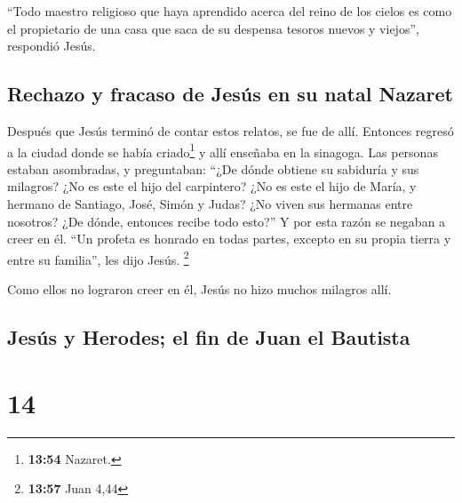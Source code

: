  ``Todo maestro religioso que haya aprendido acerca del
reino de los cielos es como el propietario de una casa que saca de su
despensa tesoros nuevos y viejos'', respondió Jesús.

\hypertarget{rechazo-y-fracaso-de-jesuxfas-en-su-natal-nazaret}{%
\subsection{Rechazo y fracaso de Jesús en su natal
Nazaret}\label{rechazo-y-fracaso-de-jesuxfas-en-su-natal-nazaret}}

 Después que Jesús terminó de contar estos relatos, se
fue de allí.  Entonces regresó a la ciudad donde se había
criado\footnote{\textbf{13:54} Nazaret.} y allí enseñaba en la sinagoga.
Las personas estaban asombradas, y preguntaban: ``¿De dónde obtiene su
sabiduría y sus milagros?  ¿No es este el hijo del
carpintero? ¿No es este el hijo de María, y hermano de Santiago, José,
Simón y Judas?  ¿No viven sus hermanas entre nosotros?
¿De dónde, entonces recibe todo esto?''  Y por esta razón
se negaban a creer en él. ``Un profeta es honrado en todas partes,
excepto en su propia tierra y entre su familia'', les dijo Jesús.
\footnote{\textbf{13:57} Juan 4,44}

 Como ellos no lograron creer en él, Jesús no hizo muchos
milagros allí.

\hypertarget{jesuxfas-y-herodes-el-fin-de-juan-el-bautista}{%
\subsection{Jesús y Herodes; el fin de Juan el
Bautista}\label{jesuxfas-y-herodes-el-fin-de-juan-el-bautista}}

\hypertarget{section-13}{%
\section{14}\label{section-13}}

